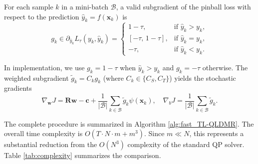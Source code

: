 \documentclass[a4paper]{cas-sc}
\begin{document}
For each sample $k$ in a mini-batch $\mathcal{B}$, a valid subgradient of the pinball loss with respect to the prediction $\hat{y}_k = f(\boldsymbol{x}_k)$ is
\begin{equation}
\label{eq:subgradient}
g_k \in \partial_{\hat{y}_k} L_{\tau}(y_k, \hat{y}_k)= \begin{cases}
    1-\tau, & \text{if } \hat{y}_k > y_k, \\
    [-\tau,\, 1-\tau], & \text{if } \hat{y}_k = y_k, \\
    -\tau, & \text{if } \hat{y}_k < y_k.
\end{cases}
\end{equation}

In implementation, we use $g_k = 1-\tau$ when $\hat{y}_k > y_k$ and $g_k = -\tau$ otherwise. The weighted subgradient $\tilde{g}_k = C_k g_k$ (where $C_k \in \{C_S, C_T\}$) yields the stochastic gradients
\begin{equation}
\label{eq:param_gradients}
\nabla_{\boldsymbol{w}} J = \boldsymbol{R} \boldsymbol{w} - \boldsymbol{c} + \frac{1}{|\mathcal{B}|} \sum_{k \in \mathcal{B}} \tilde{g}_k \psi(\boldsymbol{x}_k), \quad \nabla_b J = \frac{1}{|\mathcal{B}|} \sum_{k \in \mathcal{B}} \tilde{g}_k.
\end{equation}

The complete procedure is summarized in Algorithm \ref{alg:fast_TL-QLDMR}. The overall time complexity is $O(T \cdot N \cdot m + m^3)$. Since $m \ll N$, this represents a substantial reduction from the $O(N^3)$ complexity of the standard QP solver. Table \ref{tab:complexity} summarizes the comparison.
\end{document}
